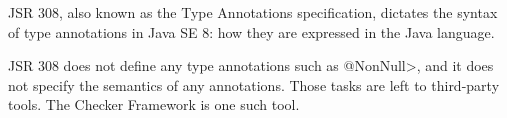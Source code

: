 
JSR 308, also known as the Type Annotations specification, dictates the
syntax of type annotations in Java SE 8:  how they are expressed in the
Java language.

JSR 308 does not define any type annotations such as \<@NonNull>, and it does
not specify the semantics of any annotations.  Those tasks are left to
third-party tools.  The Checker Framework is one such tool.



